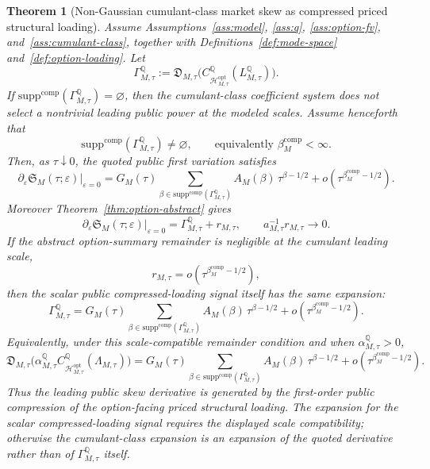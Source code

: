 \documentclass[11pt,a4paper]{amsart}
\theoremstyle{plain}
\newtheorem{theorem}{Theorem}[section]
\theoremstyle{definition}
\theoremstyle{remark}
\newcommand{\QQ}{\mathbb{Q}}
\newcommand{\cH}{\mathcal{H}}
\begin{document}
\begin{theorem}[Non-Gaussian cumulant-class market skew as compressed priced structural loading]\label{thm:market-skew}
Assume Assumptions~\ref{ass:model}, \ref{ass:q}, \ref{ass:option-fv},
and~\ref{ass:cumulant-class}, together with
Definitions~\ref{def:mode-space} and~\ref{def:option-loading}.  Let
\[
        \Gamma_{M,\tau}^\QQ
        :=
        \mathfrak D_{M,\tau}
        \bigl(C_{\cH_{M,\tau}^{\mathrm{opt}}}^\QQ(L_{M,\tau}^\QQ)\bigr).
\]
If \(\mathrm{supp}^{\mathrm{comp}}(\Gamma_{M,\tau}^\QQ)=\varnothing\), then the cumulant-class
coefficient system does not select a nontrivial leading public power at the modeled scales.
Assume henceforth that
\[
        \mathrm{supp}^{\mathrm{comp}}(\Gamma_{M,\tau}^\QQ)\neq\varnothing,
        \qquad
        \text{equivalently }
        \beta_M^{\mathrm{comp}}<\infty.
\]
Then, as \(\tau\downarrow0\), the quoted public first variation satisfies
\[
        \partial_\varepsilon
        \mathfrak S_M(\tau;\varepsilon)\big|_{\varepsilon=0}
        =
        G_M(\tau)
        \sum_{\beta\in\mathrm{supp}^{\mathrm{comp}}(\Gamma_{M,\tau}^\QQ)}
        A_M(\beta)\,\tau^{\beta-1/2}
        +
        o\!\left(\tau^{\beta_M^{\mathrm{comp}}-1/2}\right).
\]
Moreover Theorem~\ref{thm:option-abstract} gives
\[
        \partial_\varepsilon
        \mathfrak S_M(\tau;\varepsilon)\big|_{\varepsilon=0}
        =
        \Gamma_{M,\tau}^\QQ
        +
        r_{M,\tau},
        \qquad
        a_{M,\tau}^{-1}r_{M,\tau}\to0.
\]
If the abstract option-summary remainder is negligible at the cumulant leading scale,
\[
        r_{M,\tau}
        =
        o\!\left(\tau^{\beta_M^{\mathrm{comp}}-1/2}\right),
\]
then the scalar public compressed-loading signal itself has the same expansion:
\[
        \Gamma_{M,\tau}^\QQ
        =
        G_M(\tau)
        \sum_{\beta\in\mathrm{supp}^{\mathrm{comp}}(\Gamma_{M,\tau}^\QQ)}
        A_M(\beta)\,\tau^{\beta-1/2}
        +
        o\!\left(\tau^{\beta_M^{\mathrm{comp}}-1/2}\right).
\]
Equivalently, under this scale-compatible remainder condition and when
\(\alpha_{M,\tau}^\QQ>0\),
\[
        \mathfrak D_{M,\tau}
        \bigl(
                \alpha_{M,\tau}^\QQ
                C_{\cH_{M,\tau}^{\mathrm{opt}}}^\QQ(\Lambda_{M,\tau})
        \bigr)
        =
        G_M(\tau)
        \sum_{\beta\in\mathrm{supp}^{\mathrm{comp}}(\Gamma_{M,\tau}^\QQ)}
        A_M(\beta)\,\tau^{\beta-1/2}
        +
        o\!\left(\tau^{\beta_M^{\mathrm{comp}}-1/2}\right).
\]
Thus the leading public skew derivative is generated by the first-order public compression of the
option-facing priced structural loading.  The expansion for the scalar compressed-loading signal
requires the displayed scale compatibility; otherwise the cumulant-class expansion is an expansion
of the quoted derivative rather than of \(\Gamma_{M,\tau}^\QQ\) itself.
\end{theorem}
\end{document}
